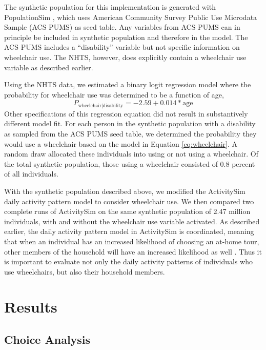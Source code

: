 \documentclass[3p, authoryear, review]{elsarticle} %
\begin{document}
The synthetic population for this implementation is generated with PopulationSim
\citep{paul2018}, which uses American Community Survey Public Use Microdata Sample
(ACS PUMS)\citep{acspums} as seed table. Any variables from ACS PUMS can in principle
be included in synthetic population and therefore in the model. The ACS PUMS
includes a ``disability'' variable but not specific information on wheelchair use.
The NHTS, however, does explicitly contain a wheelchair use variable as
described earlier.

Using the NHTS data, we estimated a binary logit regression model where the
probability for wheelchair use was determined to be a function of age,
\begin{equation}
  P_{\mathrm{wheelchair | disability}}=-2.59 + 0.014*\mathrm{age}
  \label{eq:wheelchair}
\end{equation}
Other specifications of this regression equation did not result in substantively
different model fit. For each person in the synthetic population with a disability
as sampled from the ACS PUMS seed table, we determined the probability they
would use a wheelchair based on the model in Equation \eqref{eq:wheelchair}. A random
draw allocated these individuals into using or not using a wheelchair.
Of the total synthetic population, those using a wheelchair consisted of 0.8
percent of all individuals.

With the synthetic population described above, we modified the ActivitySim
daily activity pattern model to consider wheelchair use. We then compared two
complete runs of ActivitySim on the same synthetic population of 2.47 million
individuals, with and without the wheelchair use variable activated. As described
earlier, the daily activity pattern model in ActivitySim is coordinated, meaning
that when an individual has an increased likelihood of choosing an at-home tour,
other members of the household will have an increased likelihood as well \citep{Bradley2005}.
Thus it is important to evaluate not only the daily activity patterns of
individuals who use wheelchairs, but also their household members.

\hypertarget{results}{%
\section{Results}\label{results}}

\hypertarget{choice-analysis}{%
\subsection{Choice Analysis}\label{choice-analysis}}
\end{document}
